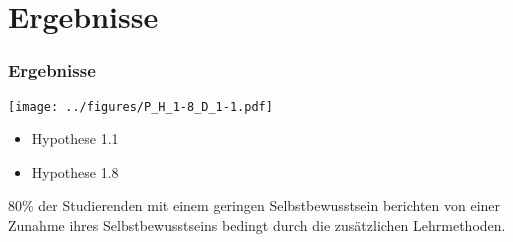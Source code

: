 \section{Ergebnisse}
\begin{frame}
\frametitle{Ergebnisse}
\begin{minipage}{.7\textwidth}
\centering
\texttt{[image: ../figures/P\_H\_1-8\_D\_1-1.pdf]}
\end{minipage}%
\begin{minipage}{.3\textwidth}
\begin{itemize}
\item Hypothese 1.1
\item Hypothese 1.8
\end{itemize}
\end{minipage}
80\% der Studierenden mit einem geringen Selbstbewusstsein berichten von einer Zunahme ihres Selbstbewusstseins bedingt durch die zusätzlichen Lehrmethoden.
\end{frame}
